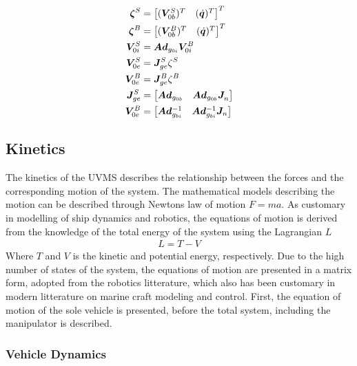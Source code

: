 \begin{mdframed}[style=graybox]
	\begin{align}
	\boldsymbol \zeta^S&=\begin{bmatrix} (\boldsymbol V_{0b}^S)^T & (\dot{\boldsymbol q})^T \end{bmatrix}^T \\
	\boldsymbol \zeta^B&=\begin{bmatrix} (\boldsymbol V_{0b}^B)^T & (\dot{\boldsymbol q})^T \end{bmatrix}^T \\
	\boldsymbol V_{0i}^S&=\boldsymbol{Ad}_{g_{0i}}\boldsymbol V_{0i}^B\\
	\boldsymbol V_{0e}^S&=\boldsymbol J_{ge}^{S}\zeta^S \\
	\boldsymbol V_{0e}^B&=\boldsymbol J_{ge}^{B}\zeta^B \\
	\boldsymbol J_{ge}^{S}&=	\begin{bmatrix} \boldsymbol{Ad}_{g_{0b}} & \boldsymbol{Ad}_{g_{0b}}\boldsymbol J_{n}^{}\end{bmatrix} \\
	\boldsymbol V_{0e}^B&= \begin{bmatrix} \boldsymbol{Ad}_{g_{bi}}^{-1} & \boldsymbol{Ad}_{g_{bi}}^{-1} \boldsymbol J_n\end{bmatrix}
\end{align}
\end{mdframed}

\subsection{Kinetics}
The kinetics of the UVMS describes the relationship between the forces and the corresponding motion of the system. The mathematical models describing the motion can be described through Newtons law of motion $F=ma$. As customary in modelling of ship dynamics and robotics, the equations of motion is derived from the knowledge of the total energy of the system using the Lagrangian $L$
\begin{align}
	L=T-V
	\label{eq:lagrange}
\end{align}
Where $T$ and $V$ is the kinetic and potential energy, respectively. Due to the high number of states of the system, the equations of motion are presented in a matrix form, adopted from the robotics litterature, which also has been customary in modern litterature on marine craft modeling and control. First, the equation of motion of the sole vehicle is presented, before the total system, including the manipulator is described.

\subsubsection{Vehicle Dynamics}

